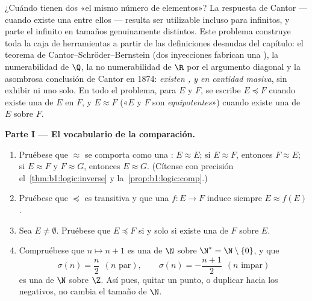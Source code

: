 \begin{problem}\label{pb:b1:logic:1}
¿Cuándo tienen dos  «el mismo número de elementos»? La
respuesta de Cantor --- cuando existe una  entre ellos ---
resulta ser utilizable incluso para  infinitos, y parte el
infinito en tamaños genuinamente distintos. Este problema construye toda
la caja de herramientas a partir de las definiciones desnudas del
capítulo: el teorema de Cantor--Schröder--Bernstein (dos inyecciones
fabrican una ), la numerabilidad de $\Q$, la no numerabilidad
de $\R$ por el argumento diagonal y la asombrosa conclusión de Cantor en
1874: \emph{existen , y en cantidad masiva}, sin
exhibir ni uno solo.
En todo el problema, para  $E$ y $F$, se escribe $E \preceq F$
cuando existe una  de $E$ en $F$, y $E \approx F$ («$E$ y $F$
son \emph{equipotentes}») cuando existe una  de $E$ sobre $F$.

\medskip
\noindent\textbf{Parte I --- El vocabulario de la comparación.}
\begin{enumerate}
  \item Pruébese que $\approx$ se comporta como una : $E \approx E$; si $E \approx F$, entonces
        $F \approx E$; si $E \approx F$ y $F \approx G$, entonces
        $E \approx G$. (Cítense con precisión
        el~\cref{thm:b1:logic:inverse} y la~\cref{prop:b1:logic:comp}.)
  \item Pruébese que $\preceq$ es transitiva y que una 
        $f \colon E \to F$ induce siempre $E \approx f(E)$.
  \item Sea $E \neq \emptyset$. Pruébese que $E \preceq F$ si y solo si
        existe una  de $F$ sobre $E$.
  \item Compruébese que $n \mapsto n + 1$ es una  de $\N$ sobre
        $\N^* = \N \setminus \{0\}$, y que
        \[
        \sigma(n) = \frac n2 \ \ (n \text{ par}), \qquad
        \sigma(n) = -\frac{n+1}2 \ \ (n \text{ impar})
        \]
        es una  de $\N$ sobre $\Z$. Así pues, quitar un punto,
        o duplicar hacia los negativos, no cambia el tamaño de $\N$.
\end{enumerate}


\end{problem}
